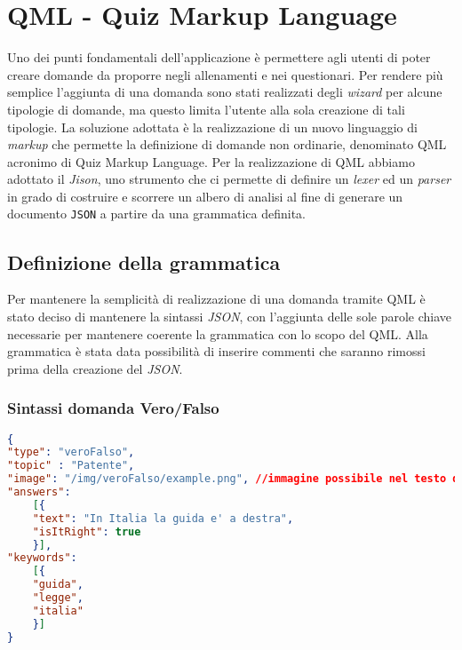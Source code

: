 \newpage
\section{QML - Quiz Markup Language}
Uno dei punti fondamentali dell'applicazione è permettere agli utenti di poter creare domande da proporre negli allenamenti e nei questionari. Per rendere più semplice l'aggiunta di una domanda sono stati realizzati degli \textit{wizard} per alcune tipologie di domande, ma questo limita l'utente alla sola creazione di tali tipologie. La soluzione adottata è la realizzazione di un nuovo linguaggio di \textit{markup} che permette la definizione di domande non ordinarie, denominato QML acronimo di Quiz Markup Language.
Per la realizzazione di QML abbiamo adottato il \textit{Jison}, uno strumento che ci permette di definire un \textit{lexer} ed un \textit{parser} in grado di costruire e scorrere un albero di analisi al fine di generare un documento \texttt{JSON} a partire da una grammatica definita.

\subsection{Definizione della grammatica}
Per mantenere la semplicità di realizzazione di una domanda tramite QML è stato deciso di mantenere la sintassi \textit{JSON}, con l'aggiunta delle sole parole chiave necessarie per mantenere coerente la grammatica con lo scopo del QML. Alla grammatica è stata data possibilità di inserire commenti che saranno rimossi prima della creazione del \textit{JSON}.

\subsubsection{Sintassi domanda Vero/Falso}
\begin{lstlisting}[language=json,firstnumber=1]
{	
"type": "veroFalso",
"topic" : "Patente",
"image": "/img/veroFalso/example.png", //immagine possibile nel testo della domanda vero e falso
"answers":
	[{
	"text": "In Italia la guida e' a destra",
	"isItRight": true
	}],
"keywords":
	[{
	"guida",
	"legge",
	"italia"
	}] 
}
\end{lstlisting}


